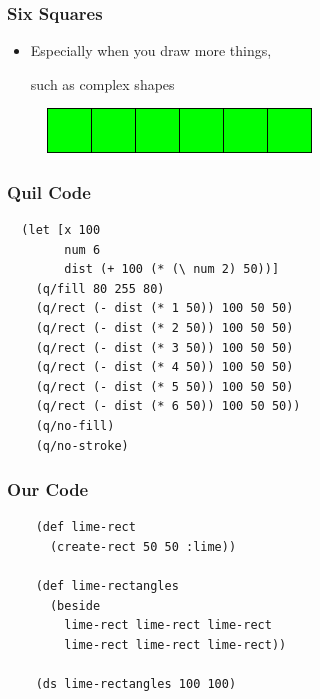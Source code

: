 \documentclass{beamer}
\begin{document}
\begin{frame}
	\frametitle{Six Squares}
	\begin{itemize}
		\item Especially when you draw more things,\par such as complex shapes
	\end{itemize}
		\begin{figure}[h]
			\includegraphics[width=7cm]{PresentationImages/lime-rectangles.png}
			\centering
		\end{figure}
\end{frame}

\begin{frame}[fragile]
\frametitle{Quil Code}
		\begin{verbatim}
  (let [x 100
  		num 6
  		dist (+ 100 (* (\ num 2) 50))]
	(q/fill 80 255 80)
	(q/rect (- dist (* 1 50)) 100 50 50)
	(q/rect (- dist (* 2 50)) 100 50 50)
	(q/rect (- dist (* 3 50)) 100 50 50)
	(q/rect (- dist (* 4 50)) 100 50 50)
	(q/rect (- dist (* 5 50)) 100 50 50)
	(q/rect (- dist (* 6 50)) 100 50 50))
	(q/no-fill)
	(q/no-stroke)
		\end{verbatim}	

\end{frame}

\begin{frame}[fragile]
\frametitle{Our Code}
	\begin{verbatim}
	(def lime-rect 
	  (create-rect 50 50 :lime))
	  
	(def lime-rectangles 
	  (beside 
	    lime-rect lime-rect lime-rect 
	    lime-rect lime-rect lime-rect))
	  						  
	(ds lime-rectangles 100 100)
	\end{verbatim}
\end{frame}
\end{document}
